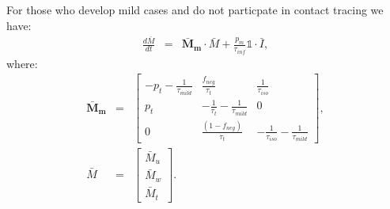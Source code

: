 \documentclass[notitlepage, superscriptaddress]{revtex4-2}
\begin{document}
For those who develop mild cases and do not particpate in contact tracing we have:
\begin{eqnarray}
\frac{d\bar{M}}{dt} &=& \boldsymbol{\bar{M}_{m}} \cdot \bar{M} + \frac{p_{m}}{\tau_{inf}} \mathbb{1} \cdot  \bar{I}, 
\end{eqnarray}
where:
%
\begin{eqnarray}
\boldsymbol{\bar{M}_{m}} &=&
\begin{bmatrix}
- p_{t} -\frac{1}{\tau_{mild}}  &  \frac{f_{neg}}{\tau_{t}}            & \frac{1}{\tau_{iso}} \\ 
 p_{t}              & -\frac{1}{\tau_{t}} -\frac{1}{\tau_{mild}}       & 0  \\ 
 0                  & \frac{(1- f_{neg})}{\tau_{t}}                        & -\frac{1}{\tau_{iso}} -\frac{1}{\tau_{mild}}
\end{bmatrix}, \\ 
%
\bar{M} &=& 
\begin{bmatrix}
\bar{M}_{u} \\ \bar{M}_{w}\\ \bar{M}_{t}
\end{bmatrix}. \\ 
%
%
\end{eqnarray} 
\end{document}
